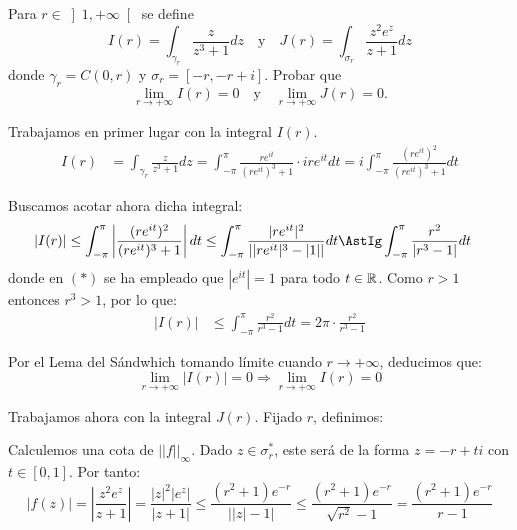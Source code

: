 \begin{ejercicio}
    Para $r \in \left]1,+\infty\right[$ se define
    \[
        I(r) = \int_{\gamma_r} \frac{z}{z^3+1}dz
        \quad \text{y} \quad
        J(r) = \int_{\sigma_r} \frac{z^2 e^z}{z+1}dz
    \]
    donde $\gamma_r = C(0,r)$ y $\sigma_r = [-r,-r+i]$. Probar que
    \[
        \lim_{r\to+\infty} I(r) = 0
        \quad \text{y} \quad
        \lim_{r\to+\infty} J(r) = 0.
    \]

    Trabajamos en primer lugar con la integral $I(r)$.
    \begin{align*}
        I(r) &= \int_{\gamma_r} \frac{z}{z^3+1}dz
        = \int_{-\pi}^{\pi} \frac{re^{it}}{(re^{it})^3+1}\cdot ire^{it}dt
        = i\int_{-\pi}^{\pi} \frac{(re^{it})^2}{(re^{it})^3+1} dt
    \end{align*}

    Buscamos acotar ahora dicha integral:
    \begin{align*}
        |I(r)| &\leq \int_{-\pi}^{\pi} \left|\frac{(re^{it})^2}{(re^{it})^3+1}\right|dt
        \leq \int_{-\pi}^{\pi} \frac{|re^{it}|^2}{\left||re^{it}|^3-|1|\right|}dt 
        \AstIg \int_{-\pi}^{\pi} \frac{r^2}{|r^3-1|}dt
    \end{align*}
    donde en $(\ast)$ se ha empleado que $|e^{it}|=1$ para todo $t \in \mathbb{R}$. Como $r>1$ entonces $r^3>1$, por lo que:
    \begin{align*}
        |I(r)| &\leq \int_{-\pi}^{\pi} \frac{r^2}{r^3-1}dt = 2\pi\cdot \frac{r^2}{r^3-1}
    \end{align*}

    Por el Lema del Sándwhich tomando límite cuando $r \to +\infty$, deducimos que:
    \begin{equation*}
        \lim_{r\to+\infty} |I(r)| = 0
        \Longrightarrow \lim_{r\to+\infty} I(r) = 0
    \end{equation*}

    Trabajamos ahora con la integral $J(r)$. Fijado $r$, definimos:

    Calculemos una cota de $||f||_\infty$. Dado $z\in \sigma_r^*$, este será de la forma $z=-r+ti$ con $t\in [0,1]$. Por tanto:
    \begin{equation*}
        \left|f(z)\right| = \left|\frac{z^2 e^z}{z+1}\right| = \frac{|z|^2|e^z|}{|z+1|} \leq \dfrac{(r^2+1)e^{-r}}{\left||z|-1\right|} 
        \leq \dfrac{(r^2+1)e^{-r}}{\sqrt{r^2}-1}
        = \dfrac{(r^2+1)e^{-r}}{r-1} 
    \end{equation*}


\end{ejercicio}
